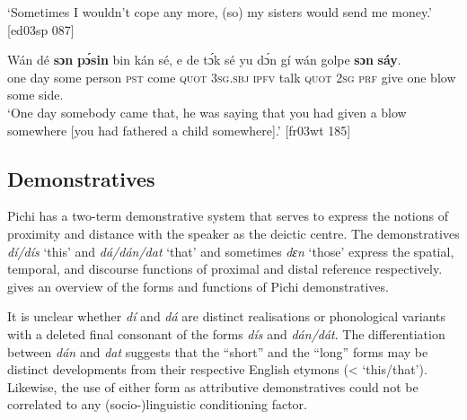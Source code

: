 \glt ‘Sometimes I wouldn’t cope any more, (so) my sisters would send me money.’ [ed03sp 087]
\z


\ea%
    \label{ex:key:191}
    \gll Wán    dé  \textbf{sɔn} \textbf{   pɔ́sin}  bin  kán    sé,    e    de
tɔ́k  sé    yu  dɔ́n  gí  wán    golpe  \textbf{sɔn} \textbf{    sáy}.\\
one    day  some  person  \textsc{pst}  come  \textsc{quot}    \textsc{3sg.sbj}  \textsc{ipfv}
talk  \textsc{quot}    \textsc{2sg}  \textsc{prf}  give  one    blow  some  side.\\

\glt ‘One day somebody came that, he was saying that you had given a blow
somewhere [you had fathered a child somewhere].’ [fr03wt 185]
\z

\subsection{Demonstratives}

Pichi has a two-term demonstrative system that serves to express the notions of proximity and distance with the speaker as the deictic centre. The demonstratives \textit{dí/dís} ‘this’ and \textit{dá/dán/dat} ‘that’ and sometimes \textit{dɛn} ‘those’ express the spatial, temporal, and discourse functions of proximal and distal reference respectively.  gives an overview of the forms and functions of Pichi demonstratives.

\begin{table}
\caption{Demonstratives}
\label{tab:key:5.2}

\end{table}

It is unclear whether \textit{dí} and \textit{dá} are distinct realisations or phonological variants with a deleted final consonant of the forms \textit{dís} and \textit{dán/dát}. The differentiation between \textit{dán} and \textit{dat} suggests that the “short” and the “long” forms may be distinct developments from their respective English etymons (< ‘this/that’). Likewise, the use of either form as attributive demonstratives could not be correlated to any (socio-)linguistic conditioning factor. 


